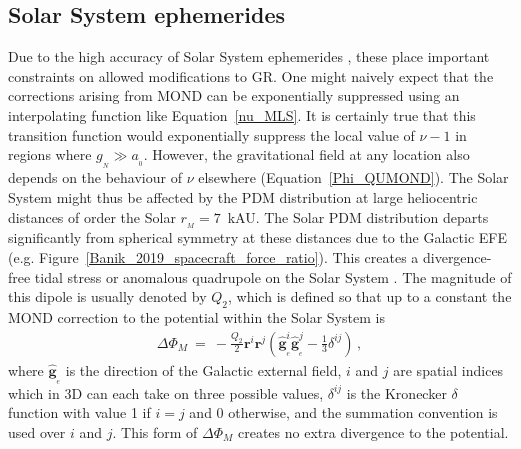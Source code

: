 \documentclass[fleqn,usenatbib,useAMS]{mnras} %
\begin{document}
\subsection{Solar System ephemerides}
\label{Solar_System_ephemerides}

Due to the high accuracy of Solar System ephemerides \citep[e.g.][]{Viswanathan_2017}, these place important constraints on allowed modifications to GR. One might naively expect that the corrections arising from MOND can be exponentially suppressed using an interpolating function like Equation~\ref{nu_MLS}. It is certainly true that this transition function would exponentially suppress the local value of $\nu - 1$ in regions where $g_{_N} \gg a_{_0}$. However, the gravitational field at any location also depends on the behaviour of $\nu$ elsewhere (Equation~\ref{Phi_QUMOND}). The Solar System might thus be affected by the PDM distribution at large heliocentric distances of order the Solar $r_{_M} = 7$~kAU. The Solar PDM distribution departs significantly from spherical symmetry at these distances due to the Galactic EFE (e.g. Figure~\ref{Banik_2019_spacecraft_force_ratio}). This creates a divergence-free tidal stress or anomalous quadrupole on the Solar System \citep{Milgrom_2009}. The magnitude of this dipole is usually denoted by $Q_2$, which is defined so that up to a constant the MOND correction to the potential within the Solar System is
\begin{eqnarray}
    \Delta \Phi_M ~=~ -\frac{Q_2}{2}\bm{r}^i \bm{r}^j \left( \widehat{\bm{g}}_{_e}^i \widehat{\bm{g}}_{_e}^j - \frac{1}{3} \delta^{ij} \right) \, ,
    \label{Q2_definition}
\end{eqnarray}
where $\widehat{\bm{g}}_{_e}$ is the direction of the Galactic external field, $i$ and $j$ are spatial indices which in 3D can each take on three possible values, $\delta^{ij}$ is the Kronecker $\delta$ function with value 1 if $i = j$ and 0 otherwise, and the summation convention is used over $i$ and $j$. This form of $\Delta \Phi_M$ creates no extra divergence to the potential.
\end{document}
